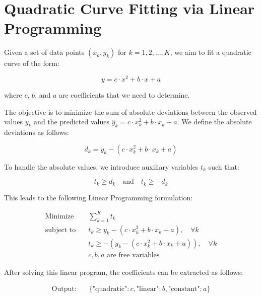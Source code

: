 \documentclass{article}
\begin{document}
\section*{Quadratic Curve Fitting via Linear Programming}

Given a set of data points $(x_k, y_k)$ for $k = 1, 2, \ldots, K$, we aim to fit a quadratic curve of the form:

\[
y = c \cdot x^2 + b \cdot x + a
\]

where \( c \), \( b \), and \( a \) are coefficients that we need to determine.

The objective is to minimize the sum of absolute deviations between the observed values \( y_k \) and the predicted values \( \hat{y}_k = c \cdot x_k^2 + b \cdot x_k + a \). We define the absolute deviations as follows:

\[
d_k = y_k - (c \cdot x_k^2 + b \cdot x_k + a)
\]

To handle the absolute values, we introduce auxiliary variables \( t_k \) such that:

\[
t_k \geq d_k \quad \text{and} \quad t_k \geq -d_k
\]

This leads to the following Linear Programming formulation:

\begin{align*}
\text{Minimize} \quad & \sum_{k=1}^{K} t_k \\
\text{subject to} \quad & t_k \geq y_k - (c \cdot x_k^2 + b \cdot x_k + a), \quad \forall k \\
& t_k \geq -(y_k - (c \cdot x_k^2 + b \cdot x_k + a)), \quad \forall k \\
& c, b, a \text{ are free variables}
\end{align*}

After solving this linear program, the coefficients can be extracted as follows:

\begin{align*}
\text{Output:} \quad & \{ \text{"quadratic"}: c, \text{"linear"}: b, \text{"constant"}: a \}
\end{align*}
\end{document}
